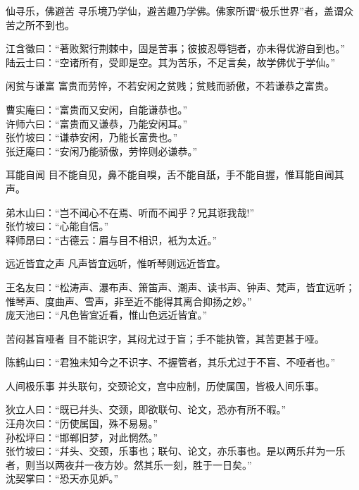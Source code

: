 \begin{yulu}{仙寻乐，佛避苦}
寻乐境乃学仙，避苦趣乃学佛。佛家所谓“极乐世界”者，盖谓众苦之所不到也。
\begin{comments}
江含徵曰：“著败絮行荆棘中，固是苦事；彼披忍辱铠者，亦未得优游自到也。” \\
陆云士曰：“空诸所有，受即是空。其为苦乐，不足言矣，故学佛优于学仙。”
\end{comments}
\end{yulu}

\begin{yulu}{闲贫与谦富}
富贵而劳悴，不若安闲之贫贱；贫贱而骄傲，不若谦恭之富贵。
\begin{comments}
曹实庵曰：“富贵而又安闲，自能谦恭也。” \\
许师六曰：“富贵而又谦恭，乃能安闲耳。” \\
张竹坡曰：“谦恭安闲，乃能长富贵也。” \\
张迂庵曰：“安闲乃能骄傲，劳悴则必谦恭。”
\end{comments}
\end{yulu}

\begin{yulu}{耳能自闻}
目不能自见，鼻不能自嗅，舌不能自舐，手不能自握，惟耳能自闻其声。
\begin{comments}
弟木山曰：“岂不闻心不在焉、听而不闻乎？兄其诳我哉!” \\
张竹坡曰：“心能自信。” \\
释师昂曰：“古德云：眉与目不相识，衹为太近。”
\end{comments}
\end{yulu}

\begin{yulu}{远近皆宜之声}
凡声皆宜远听，惟听琴则远近皆宜。
\begin{comments}
王名友曰：“松涛声、瀑布声、箫笛声、潮声、读书声、钟声、梵声，皆宜远听；惟琴声、度曲声、雪声，非至近不能得其离合抑扬之妙。” \\
庞天池曰：“凡色皆宜近看，惟山色远近皆宜。”
\end{comments}
\end{yulu}

\begin{yulu}{苦闷甚盲哑者}
目不能识字，其闷尤过于盲；手不能执管，其苦更甚于哑。
\begin{comments}
陈鹤山曰：“君独未知今之不识字、不握管者，其乐尤过于不盲、不哑者也。”
\end{comments}
\end{yulu}

\begin{yulu}{人间极乐事}
并头联句，交颈论文，宫中应制，历使属国，皆极人间乐事。
\begin{comments}
狄立人曰：“既已幷头、交颈，即欲联句、论文，恐亦有所不暇。” \\
汪舟次曰：“历使属国，殊不易易。” \\
孙松坪曰：“邯郸旧梦，对此惘然。” \\
张竹坡曰：“幷头、交颈，乐事也；联句、论文，亦乐事也。是以两乐幷为一乐者，则当以两夜幷一夜方妙。然其乐一刻，胜于一日矣。” \\
沈契掌曰：“恐天亦见妒。”
\end{comments}
\end{yulu}

